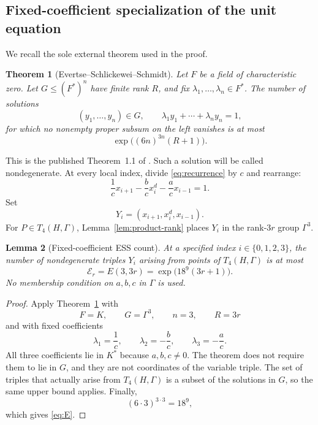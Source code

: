 \documentclass[11pt]{article}
\newtheorem{theorem}{Theorem}[section]
\newtheorem{lemma}[theorem]{Lemma}
\theoremstyle{definition}
\theoremstyle{remark}
\newcommand{\Er}{\mathcal{E}_{r}}
\begin{document}
\subsection{Fixed-coefficient specialization of the unit equation}

We recall the sole external theorem used in the proof.

\begin{theorem}[Evertse--Schlickewei--Schmidt]\label{thm:ess}
Let \(F\) be a field of characteristic zero.  Let
\(G\le(F^\ast)^n\) have finite rank \(R\), and fix
\(\lambda_1,\ldots,\lambda_n\in F^\ast\).  The number of solutions
\[
 (y_1,\ldots,y_n)\in G,\qquad
 \lambda_1y_1+\cdots+\lambda_ny_n=1,
\]
for which no nonempty proper subsum on the left vanishes is at most
\[
 \exp\!\bigl((6n)^{3n}(R+1)\bigr).
\]
\end{theorem}

This is the published Theorem~1.1 of \cite{ESS2002}.  Such a solution will
be called nondegenerate.  At every local index, divide
\eqref{eq:recurrence} by \(c\) and rearrange:
\begin{equation}\label{eq:unit}
 \frac1c x_{i+1}
 -\frac bc x_i^d
 -\frac ac x_{i-1}
 =1.
\end{equation}
Set
\begin{equation}\label{eq:variables}
 Y_i=(x_{i+1},x_i^d,x_{i-1}).
\end{equation}
For \(P\in T_4(H,\Gamma)\), Lemma~\ref{lem:product-rank} places \(Y_i\)
in the rank-\(3r\) group \(\Gamma^3\).

\begin{lemma}[Fixed-coefficient ESS count]\label{lem:ess-specialization}
At a specified index \(i\in\{0,1,2,3\}\), the number of nondegenerate
triples \(Y_i\) arising from points of \(T_4(H,\Gamma)\) is at most
\begin{equation}\label{eq:E}
 \Er=E(3,3r)
 =
 \exp\!\bigl(18^9(3r+1)\bigr).
\end{equation}
No membership condition on \(a,b,c\) in \(\Gamma\) is used.
\end{lemma}

\begin{proof}
Apply Theorem~\ref{thm:ess} with
\[
 F=K,\qquad G=\Gamma^3,\qquad n=3,\qquad R=3r
\]
and with fixed coefficients
\[
 \lambda_1=\frac1c,\qquad
 \lambda_2=-\frac bc,\qquad
 \lambda_3=-\frac ac.
\]
All three coefficients lie in \(K^\ast\) because \(a,b,c\ne0\).  The theorem
does not require them to lie in \(G\), and they are not coordinates of the
variable triple.  The set of triples that actually arise from
\(T_4(H,\Gamma)\) is a subset of the solutions in \(G\), so the same upper
bound applies.  Finally,
\[
 (6\cdot3)^{3\cdot3}=18^9,
\]
which gives \eqref{eq:E}.
\end{proof}
\end{document}
